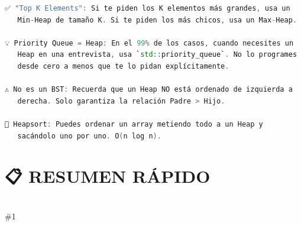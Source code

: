 \documentclass{article}
\newcommand{\resumen}[1]{
    \section*{📋 RESUMEN RÁPIDO}
    \hrulefill \\
    \#1
}
\begin{document}
\begin{lstlisting}[language=C++]
✅ "Top K Elements": Si te piden los K elementos más grandes, usa un
   Min-Heap de tamaño K. Si te piden los más chicos, usa un Max-Heap.

💡 Priority Queue = Heap: En el 99% de los casos, cuando necesites un 
   Heap en una entrevista, usa `std::priority_queue`. No lo programes
   desde cero a menos que te lo pidan explícitamente.

⚠️ No es un BST: Recuerda que un Heap NO está ordenado de izquierda a
   derecha. Solo garantiza la relación Padre > Hijo.

🔑 Heapsort: Puedes ordenar un array metiendo todo a un Heap y 
   sacándolo uno por uno. O(n log n).
\end{lstlisting}

\resumen{
• Árbol binario completo donde el jefe (raíz) es el mayor o menor.
• Implementado como Array para máxima velocidad y ahorro de memoria.
• Insertar y sacar el máximo/mínimo es O(log n).
• Ver el máximo/mínimo es instantáneo O(1).
• Usos: Algoritmo de Dijkstra, colas de prioridad, problemas de "Top K".
• Heapify (construir desde array) es sorprendentemente O(n).
════════════════════════════════════════════════════════════════
}
\end{document}
